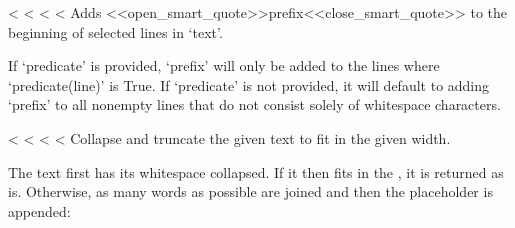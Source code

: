 \documentclass[letterpaper,10pt,english]{sphinxmanual}
\begin{document}
\begin{savenotes}
\begin{savenotes}
\begin{savenotes}
\begin{savenotes}
\begin{fulllineitems}
\end{fulllineitems}


\begin{fulllineitems}
\label{\detokenize{index:textwrap.indent}}
<%
\pysigstartsignatures
<%
<%
<%
Adds <<open_smart_quote>>prefix<<close_smart_quote>> to the beginning of selected lines in ‘text’.

If ‘predicate’ is provided, ‘prefix’ will only be added to the lines
where ‘predicate(line)’ is True. If ‘predicate’ is not provided,
it will default to adding ‘prefix’ to all non\sphinxhyphen{}empty lines that do not
consist solely of whitespace characters.

\end{fulllineitems}


\begin{fulllineitems}
\label{\detokenize{index:textwrap.shorten}}
<%
\pysigstartsignatures
<%
<%
<%
Collapse and truncate the given text to fit in the given width.

The text first has its whitespace collapsed.  If it then fits in
the , it is returned as is.  Otherwise, as many words
as possible are joined and then the placeholder is appended:

\begin{sphinxVerbatim}[commandchars=\\\{\}]
 
 
\end{sphinxVerbatim}


\end{fulllineitems}
\end{savenotes}
\end{savenotes}
\end{savenotes}
\end{savenotes}
\end{document}
